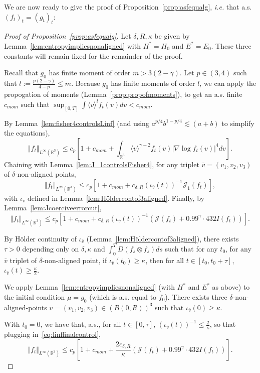\documentclass[11pt,a4paper]{article}
\theoremstyle{definition}
\theoremstyle{plain}
\newcommand{\jap}[1]{\langle #1 \rangle}
\begin{document}
We are now ready to give the proof of Proposition~\ref{prop:asfequalg}, \textit{i.e.} that a.s. $(f_t)_t=(g_t)_t$:
\begin{proof}[Proof of Proposition~\ref{prop:asfequalg}]
Let $\delta,R,\kappa$ be given by Lemma~\ref{lem:entropyimpliesnonaligned} with $H^*=H_0$ and $E^*=E_0$. These three constants will remain fixed for the remainder of the proof.

 Recall that $g_0$ has finite moment of order $m> 3(2-\gamma)$. Let $p\in(3,4)$ such that $l:=\frac{p(2-\gamma)}{4-p}\leq m$. Because $g_0$ has finite moments of order $l$, we can apply the propogation of moments (Lemma~\ref{prop:propofmoments}), to get an a.s. finite $c_{mom}$ such that $\sup_{[0,T]} \int \jap{v}^l f_t(v)dv < c_{mom}.$

By Lemma~\ref{lem:fisher4controlsLinf} (and using $a^{p/4} b^{1-p/4}\lesssim (a + b)$ to simplify the equations),
$$\Vert f_t\Vert_{L^\infty(\mathbb{R}^3)} \leq c_p\left[1+c_{mom} +\int_{\mathbb{R}^{3}}\jap{v}^{\gamma-2}f_t(v) \left\vert\nabla\log f_t(v) \right\vert^{4} dv\right].$$
Chaining with Lemma~\ref{lem:J_1controlsFisher4}, for any triplet $\bar{v}=(v_1,v_2,v_3)$ of $\delta$-non-aligned points,
$$\Vert f_t\Vert_{L^\infty(\mathbb{R}^3)} \leq c_p\left[1+c_{mom} + c_{\delta,R} (\iota_{\bar{v}}(t))^{-1}\mathcal{J}_1(f_t) \right],$$
with $\iota_{\bar{v}}$ defined in Lemma~\ref{lem:Höldercontof3aligned}. Finally, by Lemma~\ref{lem:Jcoerciveerrorcut}, 
\begin{equation}
\label{eq:linffinalcontrol}
\Vert f_t\Vert_{L^\infty(\mathbb{R}^3)} \leq c_p\left[1+c_{mom} + c_{\delta,R} (\iota_{\bar{v}}(t))^{-1}\left(\mathcal{J}(f_t) + 0.99^\gamma \cdot 432I(f_t)\right) \right].
\end{equation}

By Hölder continuity of $\iota_{\bar{v}}$ (Lemma~\ref{lem:Höldercontof3aligned}), there exists $\tau>0$ depending only on $\delta,\kappa$ and $\int_0^T D(f_s\otimes f_s)ds$ such that for any $t_0$, for any $\bar{v}$ triplet of $\delta$-non-aligned point, if $\iota_{\bar{v}}(t_0)\geq \kappa$, then for all $t\in[t_0,t_0+\tau]$, 
$\iota_{\bar{v}}(t)\geq \frac{\kappa}{2}$.

We apply Lemma~\ref{lem:entropyimpliesnonaligned} (with $H^*$ and $E^*$ as above) to the initial condition $\mu=g_0$ (which is a.s. equal to $f_0$). There exists three $\delta$-non-aligned-points $\bar{v}=(v_1,v_2,v_3)\in (B(0,R))^3$ such that
$\iota_{\bar{v}}(0)\geq \kappa$.

With $t_0=0$, we have that, a.s., for all $t\in[0,\tau]$, $(\iota_{\bar{v}}(t))^{-1} \leq \frac{2}{\kappa}$, so that plugging in~\eqref{eq:linffinalcontrol},
$$\Vert f_t\Vert_{L^\infty(\mathbb{R}^3)} \leq c_p\left[1+c_{mom} +  \frac{2c_{\delta,R}}{\kappa}\left(\mathcal{J}(f_t) + 0.99^\gamma \cdot 432I(f_t)\right) \right].$$


\end{proof}
\end{document}
